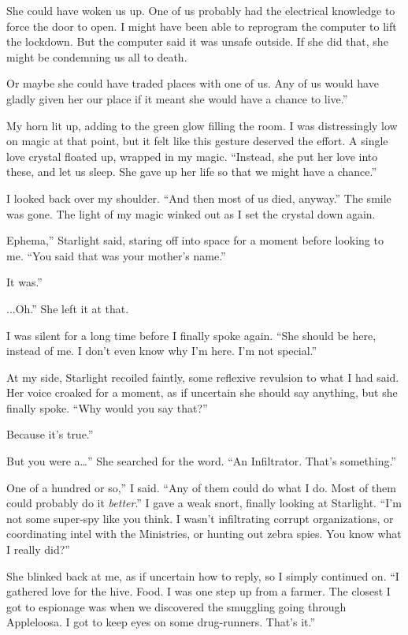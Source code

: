 \leavevmode{}She could have woken us up. One of us probably had the electrical knowledge to force the door to open. I might have been able to reprogram the computer to lift the lockdown. But the computer said it was unsafe outside. If she did that, she might be condemning us all to death.

\leavevmode{}Or maybe she could have traded places with one of us. Any of us would have gladly given her our place if it meant she would have a chance to live.”

My horn lit up, adding to the green glow filling the room. I was distressingly low on magic at that point, but it felt like this gesture deserved the effort. A single love crystal floated up, wrapped in my magic. “Instead, she put her love into these, and let us sleep. She gave up her life so that we might have a chance.”

I looked back over my shoulder. “And then most of us died, anyway.” The smile was gone. The light of my magic winked out as I set the crystal down again.

\leavevmode{}Ephema,” Starlight said, staring off into space for a moment before looking to me. “You said that was your mother’s name.”

\leavevmode{}It was.”

\leavevmode{}...Oh.” She left it at that.

I was silent for a long time before I finally spoke again. “She should be here, instead of me. I don’t even know why I’m here. I’m not special.”

At my side, Starlight recoiled faintly, some reflexive revulsion to what I had said. Her voice croaked for a moment, as if uncertain she should say anything, but she finally spoke. “Why would you say that?”

\leavevmode{}Because it’s true.”

\leavevmode{}But you were a…” She searched for the word. “An Infiltrator. That’s something.”

\leavevmode{}One of a hundred or so,” I said. “Any of them could do what I do. Most of them could probably do it \textit{better}.” I gave a weak snort, finally looking at Starlight. “I’m not some super-spy like you think. I wasn’t infiltrating corrupt organizations, or coordinating intel with the Ministries, or hunting out zebra spies. You know what I really did?”

She blinked back at me, as if uncertain how to reply, so I simply continued on. “I gathered love for the hive. Food. I was one step up from a farmer. The closest I got to espionage was when we discovered the smuggling going through Appleloosa. I got to keep eyes on some drug-runners. That’s it.”

